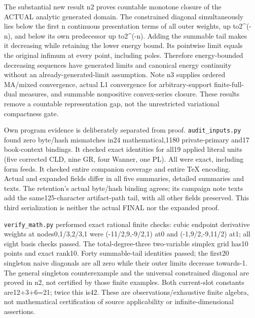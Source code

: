 \documentclass[11pt]{article}
\begin{document}
The substantial new result n2 proves countable monotone closure of the ACTUAL analytic generated domain. The constrained diagonal simultaneously lies below the first n continuous presentation terms of all outer weights, up to2\textasciicircum{}(-n), and below its own predecessor up to2\textasciicircum{}(-n). Adding the summable tail makes it decreasing while retaining the lower energy bound. Its pointwise limit equals the original infimum at every point, including poles. Therefore energy-bounded decreasing sequences have generated limits and canonical energy continuity without an already-generated-limit assumption. Note n3 supplies ordered MA/mixed convergence, actual L1 convergence for arbitrary-support finite-full-dual measures, and summable nonpositive convex-series closure. These results remove a countable representation gap, not the unrestricted variational compactness gate.

Own program evidence is deliberately separated from proof. \texttt{audit\_inputs.py} found zero byte/hash mismatches in24 mathematical,1180 private-primary and17 book-context bindings. It checked exact identities for all19 applied literal units (five corrected CLD, nine GR, four Wanner, one PL). All were exact, including form feeds. It checked entire companion coverage and entire TeX encoding. Actual and expanded fields differ in all five summaries, detailed summaries and texts. The retention's actual byte/hash binding agrees; its campaign note texts add the same125-character artifact-path tail, with all other fields preserved. This third serialization is neither the actual FINAL nor the expanded proof.

\texttt{verify\_math.py} performed exact rational finite checks: cubic endpoint derivative weights at nodes0,1/3,2/3,1 were (-11/2,9,-9/2,1) at0 and (-1,9/2,-9,11/2) at1; all eight basis checks passed. The total-degree-three two-variable simplex grid has10 points and exact rank10. Forty summable-tail identities passed; the first20 singleton naive diagonals are all zero while their outer limits decrease towards-1. The general singleton counterexample and the universal constrained diagonal are proved in n2, not certified by those finite examples. Both current-slot constants are12+3+6=21; twice this is42. These are observations/exhaustive finite algebra, not mathematical certification of source applicability or infinite-dimensional assertions.
\end{document}
